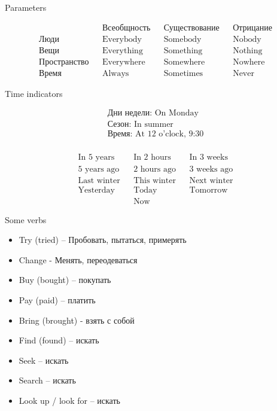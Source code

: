 \documentclass{tstextbook}
\begin{document}
\begin{theorem} Parameters
	\label{th: Parameters}
	
	\begin{align*}
		&& \text{Всеобщность} && \text{Существование} && \text{Отрицание} \\
		\text{Люди} && \text{Everybody} && \text{Somebody} && \text{Nobody} \\
		\text{Вещи} && \text{Everything} && \text{Something} && \text{Nothing} \\
		\text{Пространство} && \text{Everywhere} && \text{Somewhere} && \text{Nowhere} \\
		\text{Время} && \text{Always} && \text{Sometimes} && \text{Never}
	\end{align*}
\end{theorem}

\begin{theorem} Time indicators
	\label{th: Time_indicators}
	
	\begin{align*}
		\text{Дни недели: On Monday} \\
		\text{Сезон: In summer} \\
		\text{Время: At 12 o'clock, 9:30} \\
	\end{align*}
	
	\begin{align*}
		\text{In 5 years} && \text{In 2 hours} && \text{In 3 weeks} \\
		\text{5 years ago} && \text{2 hours ago} && \text{3 weeks ago} \\		
		\text{Last winter} && \text{This winter} && \text{Next winter} \\
		\text{Yesterday} && \text{Today} && \text{Tomorrow} \\
		&& \text{Now} &&
	\end{align*}
\end{theorem}
	
	\begin{example}Some verbs
		\label{def:some_verbs}
		\begin{itemize}
			\item Try (tried) -- Пробовать, пытаться, примерять
			\item Change - Менять, переодеваться
			\item Buy (bought) -- покупать
			\item Pay (paid) -- платить
			\item Bring (brought) - взять с собой
			\item Find (found) -- искать
			\item Seek -- искать
			\item Search -- искать
			\item Look up / look for -- искать
		\end{itemize}
	\end{example}
	
\end{document}
